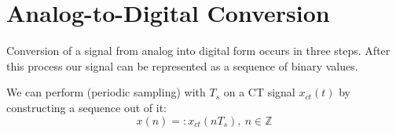 \section{Analog-to-Digital Conversion}
Conversion of a signal from analog into digital form occurs in three steps. After this process our signal can be represented as a sequence of binary values.

We can perform  (periodic sampling) with  $T_s$ on a CT signal $x_{ct}(t)$ by constructing a sequence out of it:
\[ x(n) =: x_{ct}(nT_s) ,\ n\in \mathbb{Z} \]

